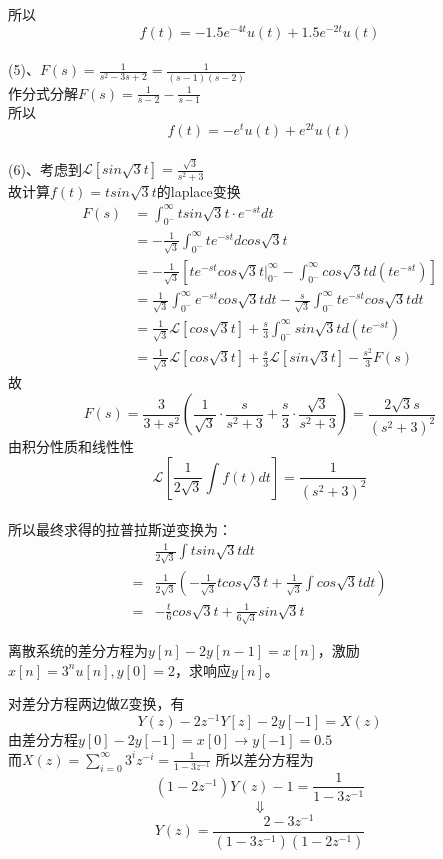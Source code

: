 \documentclass[answers]{exam}  %
\begin{document}
\begin{questions}
\begin{solution}
所以$$f(t)=-1.5e^{-4t}u(t)+1.5e^{-2t}u(t)$$
~\\
(5)、$F(s)=\frac{1}{s^2-3s+2}=\frac{1}{(s-1)(s-2)}$\\
作分式分解$F(s)=\frac{1}{s-2}-\frac{1}{s-1}$\\
所以$$f(t)=-e^tu(t)+e^{2t}u(t)$$
~\\
(6)、考虑到$\mathcal{L}[sin\sqrt{3}t]=\frac{\sqrt{3}}{s^2+3}$\\
故计算$f(t)=tsin\sqrt{3}t$的laplace变换\\
\begin{align*}
	F(s)&=\int_{0^-}^\infty tsin\sqrt{3}t\cdot e^{-st}dt\\
	&=-\frac{1}{\sqrt{3}}\int_{0^-}^\infty te^{-st}dcos\sqrt{3}t\\
	&=-\frac{1}{\sqrt{3}}[te^{-st}cos\sqrt{3}t|_{0^-}^\infty-\int_{0^-}^\infty cos\sqrt{3}td(te^{-st})]\\
	&=\frac{1}{\sqrt{3}}\int_{0^-}^\infty e^{-st}cos\sqrt{3}tdt-\frac{s}{\sqrt{3}}\int_{0^-}^\infty te^{-st}cos\sqrt{3}tdt\\
	&=\frac{1}{\sqrt{3}}\mathcal{L}[cos\sqrt{3}t]+\frac{s}{3}\int_{0^-}^\infty sin\sqrt{3}td(te^{-st})\\
	&=\frac{1}{\sqrt{3}}\mathcal{L}[cos\sqrt{3}t]+\frac{s}{3}\mathcal{L}[sin\sqrt{3}t]-\frac{s^2}{3}F(s)
\end{align*}
故$$F(s)=\frac{3}{3+s^2}(\frac{1}{\sqrt{3}}\cdot\frac{s}{s^2+3}+\frac{s}{3}\cdot\frac{\sqrt{3}}{s^2+3})=\frac{2\sqrt{3}s}{(s^2+3)^2}$$
由积分性质和线性性$$\mathcal{L}[\frac{1}{2\sqrt{3}}\int f(t)dt]=\frac{1}{(s^2+3)^2}$$
~\\
所以最终求得的拉普拉斯逆变换为：
\begin{align*}
	&\frac{1}{2\sqrt{3}}\int tsin\sqrt{3}tdt\\
	=&\frac{1}{2\sqrt{3}}(-\frac{1}{\sqrt{3}}tcos\sqrt{3}t+\frac{1}{\sqrt{3}}\int cos\sqrt{3}tdt)\\
	=&-\frac{t}{6}cos\sqrt{3}t+\frac{1}{6\sqrt{3}}sin\sqrt{3}t
\end{align*}
\end{solution}
\newpage
\question 离散系统的差分方程为$y[n]-2y[n-1]=x[n]$，激励$x[n]=3^{n}u[n],y[0]=2$，求响应$y[n]$。
\begin{solution}
	对差分方程两边做Z变换，有$$Y(z)-2z^{-1}Y[z]-2y[-1]=X(z)$$
	由差分方程$y[0]-2y[-1]=x[0]\rightarrow y[-1]=0.5$\\
	而$X(z)=\sum_{i=0}^{\infty}3^{i}z^{-i}=\frac{1}{1-3z^{-1}}$
	所以差分方程为$$(1-2z^{-1})Y(z)-1=\frac{1}{1-3z^{-1}}$$
	$$\Downarrow$$
	$$Y(z)=\frac{2-3z^{-1}}{(1-3z^{-1})(1-2z^{-1})}$$

\end{solution}
\end{questions}
\end{document}
